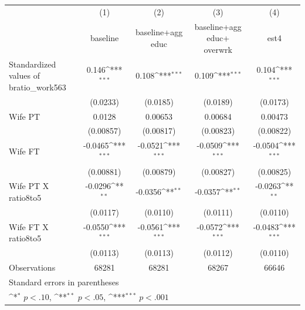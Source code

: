 {
\def\sym#1{\ifmmode^{#1}\else\(^{#1}\)\fi}
\begin{tabular}{l*{4}{c}}
\hline\hline
                    &\multicolumn{1}{c}{(1)}&\multicolumn{1}{c}{(2)}&\multicolumn{1}{c}{(3)}&\multicolumn{1}{c}{(4)}\\
                    &\multicolumn{1}{c}{baseline }&\multicolumn{1}{c}{baseline+agg educ}&\multicolumn{1}{c}{baseline+agg educ+ overwrk}&\multicolumn{1}{c}{est4}\\
\hline
Standardized values of bratio\_work563&       0.146\sym{***}&       0.108\sym{***}&       0.109\sym{***}&       0.104\sym{***}\\
                    &    (0.0233)         &    (0.0185)         &    (0.0189)         &    (0.0173)         \\
[1em]
Wife PT             &      0.0128         &     0.00653         &     0.00684         &     0.00473         \\
                    &   (0.00857)         &   (0.00817)         &   (0.00823)         &   (0.00822)         \\
[1em]
Wife FT             &     -0.0465\sym{***}&     -0.0521\sym{***}&     -0.0509\sym{***}&     -0.0504\sym{***}\\
                    &   (0.00881)         &   (0.00879)         &   (0.00827)         &   (0.00825)         \\
[1em]
Wife PT X ratio8to5 &     -0.0296\sym{**} &     -0.0356\sym{**} &     -0.0357\sym{**} &     -0.0263\sym{**} \\
                    &    (0.0117)         &    (0.0110)         &    (0.0111)         &    (0.0110)         \\
[1em]
Wife FT X ratio8to5 &     -0.0550\sym{***}&     -0.0561\sym{***}&     -0.0572\sym{***}&     -0.0483\sym{***}\\
                    &    (0.0113)         &    (0.0113)         &    (0.0112)         &    (0.0110)         \\
\hline
Observations        &       68281         &       68281         &       68267         &       66646         \\
\hline\hline
\multicolumn{5}{l}{\footnotesize Standard errors in parentheses}\\
\multicolumn{5}{l}{\footnotesize \sym{*} \(p<.10\), \sym{**} \(p<.05\), \sym{***} \(p<.001\)}\\
\end{tabular}
}
